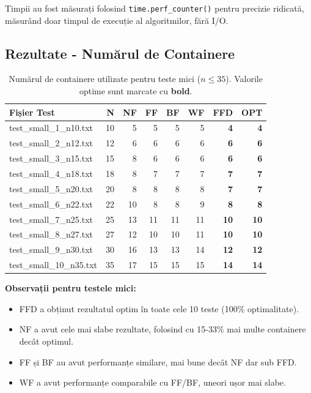 \documentclass[runningheads]{llncs}
\begin{document}
Timpii au fost măsurați folosind \texttt{time.perf\_counter()} pentru precizie ridicată, măsurând doar timpul de execuție al algoritmilor, fără I/O.

\subsection{Rezultate - Numărul de Containere}

\begin{table}[H]
\centering
\caption{Numărul de containere utilizate pentru teste mici ($n \leq 35$). Valorile optime sunt marcate cu \textbf{bold}.}
\label{tab:bins_small}
\scriptsize
\begin{tabular}{|l|r|r|r|r|r|r|r|}
\hline
\textbf{Fișier Test} & \textbf{N} & \textbf{NF} & \textbf{FF} & \textbf{BF} & \textbf{WF} & \textbf{FFD} & \textbf{OPT} \\
\hline
test\_small\_1\_n10.txt & 10 & 5 & 5 & 5 & 5 & \textbf{4} & \textbf{4} \\
test\_small\_2\_n12.txt & 12 & 6 & 6 & 6 & 6 & \textbf{6} & \textbf{6} \\
test\_small\_3\_n15.txt & 15 & 8 & 6 & 6 & 6 & \textbf{6} & \textbf{6} \\
test\_small\_4\_n18.txt & 18 & 8 & 7 & 7 & 7 & \textbf{7} & \textbf{7} \\
test\_small\_5\_n20.txt & 20 & 8 & 8 & 8 & 8 & \textbf{7} & \textbf{7} \\
test\_small\_6\_n22.txt & 22 & 10 & 8 & 8 & 9 & \textbf{8} & \textbf{8} \\
test\_small\_7\_n25.txt & 25 & 13 & 11 & 11 & 11 & \textbf{10} & \textbf{10} \\
test\_small\_8\_n27.txt & 27 & 12 & 10 & 10 & 11 & \textbf{10} & \textbf{10} \\
test\_small\_9\_n30.txt & 30 & 16 & 13 & 13 & 14 & \textbf{12} & \textbf{12} \\
test\_small\_10\_n35.txt & 35 & 17 & 15 & 15 & 15 & \textbf{14} & \textbf{14} \\
\hline
\end{tabular}
\end{table}

\textbf{Observații pentru testele mici:}
\begin{itemize}
    \item FFD a obținut rezultatul optim în toate cele 10 teste (100\% optimalitate).
    \item NF a avut cele mai slabe rezultate, folosind cu 15-33\% mai multe containere decât optimul.
    \item FF și BF au avut performanțe similare, mai bune decât NF dar sub FFD.
    \item WF a avut performanțe comparabile cu FF/BF, uneori ușor mai slabe.
\end{itemize}
\end{document}
